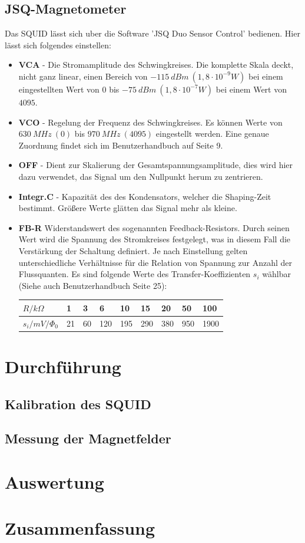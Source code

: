 \documentclass[12pt]{article}
\begin{document}
\subsection{JSQ-Magnetometer}
Das SQUID lässt sich uber die Software ’JSQ Duo Sensor Control’ bedienen. Hier lässt sich folgendes einstellen:
\begin{itemize}
 \item \textbf{VCA} - Die Stromamplitude des Schwingkreises. Die komplette Skala deckt, nicht ganz linear, einen
       Bereich von $-115~dBm ~(1, 8 \cdot 10^{-9} W)$ bei einem eingestellten Wert von $0$ bis $-75~ dBm ~(1,8 \cdot 10^{-7} W)$ bei einem Wert von $4095$.
 \item \textbf{VCO} - Regelung der Frequenz des Schwingkreises. Es können Werte von $630~MHz~(0)$ bis $970~MHz~(4095)$ eingestellt werden. Eine genaue
       Zuordnung findet sich im Benutzerhandbuch auf Seite 9.
 \item \textbf{OFF} - Dient zur Skalierung der Gesamtspannungsamplitude, dies wird hier dazu verwendet, das Signal um den Nullpunkt herum zu zentrieren.
 \item \textbf{Integr.C} - Kapazität des des Kondensators, welcher die Shaping-Zeit bestimmt. Größere Werte glätten das Signal mehr als kleine.
 \item \textbf{FB-R} Widerstandswert des sogenannten Feedback-Resistors. Durch seinen Wert wird die Spannung des Stromkreises festgelegt, was in
       diesem Fall die Verstärkung der Schaltung definiert. Je nach Einstellung gelten unterschiedliche Verhältnisse für die Relation von Spannung
       zur Anzahl der Flussquanten. Es sind folgende Werte des Transfer-Koeffizienten $s_i$ wählbar (Siehe auch Benutzerhandbuch Seite 25):
       \begin{center}
\begin{tabular}{|l|llllllll|}
\hline 
$R / k\Omega$ & 1 & 3 & 6 & 10 & 15 & 20 & 50 & 100\\
\hline 
$s_i / mV / \Phi_0$ & 21 & 60 & 120 & 195 & 290 & 380 & 950 & 1900\\
\hline 
       \end{tabular}
       \end{center}


\end{itemize}



\section{Durchführung}
\subsection{Kalibration des SQUID}
\subsection{Messung der Magnetfelder}

\section{Auswertung}

\section{Zusammenfassung}
\end{document}
